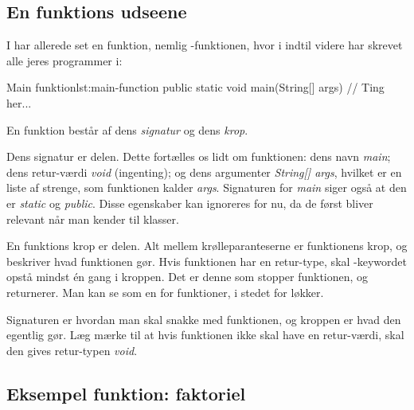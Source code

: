 

	\subsection{En funktions udseene}

		I har allerede set en funktion, nemlig -funktionen, hvor i
		indtil videre har skrevet alle jeres programmer i:

		\begin{JavaCode}{Main funktion}{lst:main-function}
			public static void main(String[] args) {
				// Ting her...
			}
		\end{JavaCode}

		En funktion består af dens \emph{signatur} og dens \emph{krop}.

        Dens signatur er 
        delen.  Dette fortælles os lidt om funktionen: dens
        navn \emph{main}; dens retur-værdi \emph{void} (ingenting); og
        dens argumenter \emph{String[] args}, hvilket er en liste af
        strenge, som funktionen kalder \emph{args}.  Signaturen for
        \emph{main} siger også at den er \emph{static} og
        \emph{public}. Disse egenskaber kan ignoreres for nu, da de
        først bliver relevant når man kender til klasser.

        En funktions krop er  delen. Alt
        mellem krølleparanteserne er funktionens krop, og beskriver
        hvad funktionen gør.  Hvis funktionen har en retur-type, skal
        -keywordet opstå mindst én gang i kroppen.
        Det er denne som stopper funktionen, og returnerer. Man kan se
         som en  for funktioner,
        i stedet for løkker.

        Signaturen er hvordan man skal snakke med funktionen, og
        kroppen er hvad den egentlig gør. Læg mærke til at hvis
        funktionen ikke skal have en retur-værdi, skal den gives
        retur-typen \emph{void}.

	\subsection{Eksempel funktion: faktoriel}

